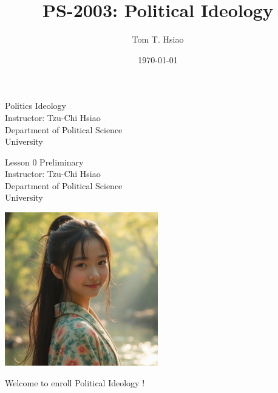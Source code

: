 \documentclass{beamer}
\title{PS-2003: Political Ideology}
\author{Tom T. Hsiao}
\date{\today}
\begin{document}
\begin{frame}
\begin{center}
\Large{Politics Ideology} \\
\vspace{3em}
\normalsize{Instructor: Tzu-Chi Hsiao} \\
\vspace{3em}
\small{Department of Political Science} \\
\vspace{1em}
\small{University}
\end{center}
\end{frame}
\begin{frame}
\begin{center}
\Large{Lesson 0 Preliminary} \\
\vspace{3em}
\normalsize{Instructor: Tzu-Chi Hsiao} \\
\vspace{3em}
\small{Department of Political Science} \\
\vspace{1em}
\small{University} \\
\end{center}
\end{frame}
\begin{frame}{}
\begin{center}
\includegraphics[width=0.5\textwidth]{instructor.png}
\end{center}
\vspace{1em}
\begin{center}
\Large{Welcome to enroll Political Ideology !}
\end{center}
\end{frame}
\end{document}
